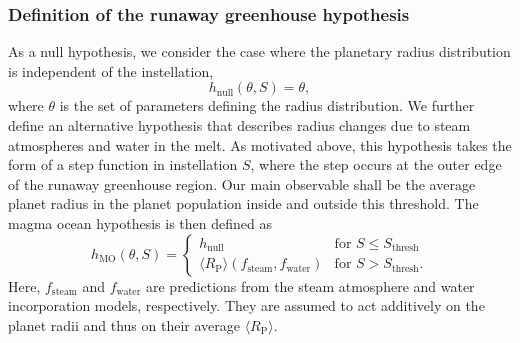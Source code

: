 \documentclass[modern]{aastex631}
\begin{document}
\subsubsection{Definition of the runaway greenhouse hypothesis}
\begin{note}
\end{note}
    As a null hypothesis, we consider the case where the planetary radius distribution is independent of the instellation,
    \begin{equation}
        h_{\mathrm{null}}(\theta, S) = \theta,
    \end{equation}
    where $\theta$ is the set of parameters defining the radius distribution.
    We further define an alternative hypothesis that describes radius changes due to steam atmospheres and water in the melt.
    As motivated above, this hypothesis takes the form of a step function in instellation $S$, where the step occurs at the outer edge of the runaway greenhouse region.
    Our main observable shall be the average planet radius in the planet population inside and outside this threshold.
    The magma ocean hypothesis is then defined as
\begin{equation}\label{eq:mo_hypo}
    h_{\mathrm{MO}}(\theta, S) =
        \begin{cases}
        h_{\mathrm{null}} & \text{for } S \leq S_\mathrm{thresh}\\
        \langle R_\mathrm{P}\rangle (f_\mathrm{steam}, f_\mathrm{water}) & \text{for } S > S_\mathrm{thresh}.
    \end{cases}
\end{equation}
    Here, $f_\mathrm{steam}$ and $f_\mathrm{water}$ are predictions from the steam atmosphere and water incorporation models, respectively.
    They are assumed to act additively on the planet radii and thus on their average $\langle R_\mathrm{P}\rangle $.
\end{document}
